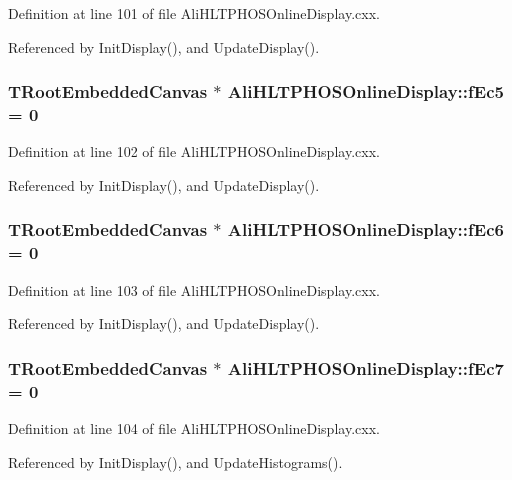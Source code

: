 Definition at line 101 of file Ali\-HLTPHOSOnline\-Display.cxx.

Referenced by Init\-Display(), and Update\-Display().
\subsubsection{\setlength{\rightskip}{0pt plus 5cm}TRoot\-Embedded\-Canvas $\ast$ {\bf Ali\-HLTPHOSOnline\-Display::f\-Ec5} = 0\hspace{0.3cm}{\tt  [static, private]}}\label{classAliHLTPHOSOnlineDisplay_v26}




Definition at line 102 of file Ali\-HLTPHOSOnline\-Display.cxx.

Referenced by Init\-Display(), and Update\-Display().
\subsubsection{\setlength{\rightskip}{0pt plus 5cm}TRoot\-Embedded\-Canvas $\ast$ {\bf Ali\-HLTPHOSOnline\-Display::f\-Ec6} = 0\hspace{0.3cm}{\tt  [static, private]}}\label{classAliHLTPHOSOnlineDisplay_v27}




Definition at line 103 of file Ali\-HLTPHOSOnline\-Display.cxx.

Referenced by Init\-Display(), and Update\-Display().
\subsubsection{\setlength{\rightskip}{0pt plus 5cm}TRoot\-Embedded\-Canvas $\ast$ {\bf Ali\-HLTPHOSOnline\-Display::f\-Ec7} = 0\hspace{0.3cm}{\tt  [static, private]}}\label{classAliHLTPHOSOnlineDisplay_v28}




Definition at line 104 of file Ali\-HLTPHOSOnline\-Display.cxx.

Referenced by Init\-Display(), and Update\-Histograms().
